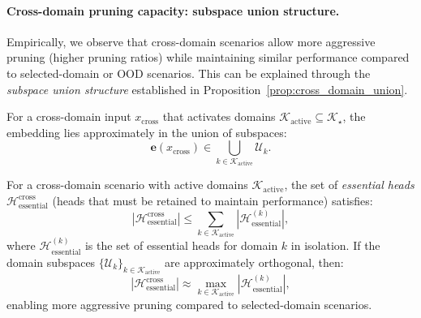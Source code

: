\paragraph{Cross-domain pruning capacity: subspace union structure.}
Empirically, we observe that cross-domain scenarios allow more aggressive pruning (higher pruning ratios) while maintaining similar performance compared to selected-domain or OOD scenarios.
This can be explained through the \emph{subspace union structure} established in Proposition~\ref{prop:cross_domain_union}.

For a cross-domain input $x_{\mathrm{cross}}$ that activates domains $\mathcal{K}_{\mathrm{active}} \subseteq \mathcal{K}_\star$, the embedding lies approximately in the union of subspaces:
\begin{equation}
\mathbf{e}(x_{\mathrm{cross}}) \in \bigcup_{k \in \mathcal{K}_{\mathrm{active}}} \mathcal{U}_k.
\end{equation}

\begin{theorem}
\label{thm:cross_domain_capacity}
For a cross-domain scenario with active domains $\mathcal{K}_{\mathrm{active}}$, the set of \emph{essential heads} $\mathcal{H}_{\mathrm{essential}}^{\mathrm{cross}}$ (heads that must be retained to maintain performance) satisfies:
\begin{equation}
|\mathcal{H}_{\mathrm{essential}}^{\mathrm{cross}}| \leq \sum_{k \in \mathcal{K}_{\mathrm{active}}} |\mathcal{H}_{\mathrm{essential}}^{(k)}|,
\end{equation}
where $\mathcal{H}_{\mathrm{essential}}^{(k)}$ is the set of essential heads for domain $k$ in isolation.
If the domain subspaces $\{\mathcal{U}_k\}_{k \in \mathcal{K}_{\mathrm{active}}}$ are approximately orthogonal, then:
\begin{equation}
|\mathcal{H}_{\mathrm{essential}}^{\mathrm{cross}}| \approx \max_{k \in \mathcal{K}_{\mathrm{active}}} |\mathcal{H}_{\mathrm{essential}}^{(k)}|,
\end{equation}
enabling more aggressive pruning compared to selected-domain scenarios.
\end{theorem}

